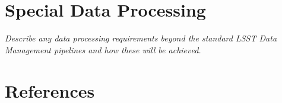 \documentclass[11pt]{article}
\begin{document}
\vspace{.6in}

\section{Special Data Processing}
\begin{footnotesize}
{\it Describe any data processing requirements beyond the standard LSST Data Management pipelines and how these will be achieved.}
\end{footnotesize}


\section{References}

 

\end{document}
